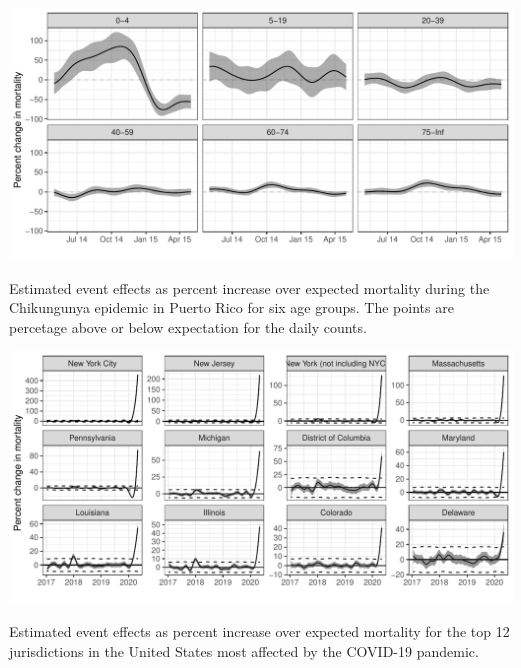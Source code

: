 \documentclass[11pt]{article}
\begin{document}
\begin{suppfigure}[ht]
	\centering
	\includegraphics[width=1\linewidth]{figs/supp-figure-4.pdf} 
    \caption{Estimated event effects as percent increase over expected mortality during the Chikungunya epidemic in Puerto Rico for six age groups. The points are percetage above or below expectation for the daily counts.}
	\label{supp-fig:chikungunya-agegroups}
\end{suppfigure}

\begin{suppfigure}[ht]
	\centering
	\includegraphics[width=1\linewidth]{figs/supp-figure-5.pdf} 
	\caption{Estimated event effects as percent increase over expected mortality for the top 12 jurisdictions in the United States most affected by the COVID-19 pandemic.}
	\label{supp-fig:covid19-states}
\end{suppfigure}
\end{document}
